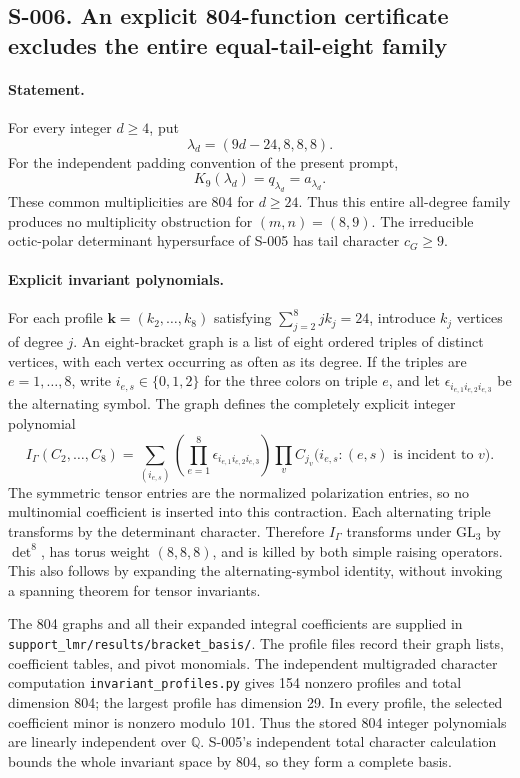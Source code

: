 \subsection*{S-006. An explicit 804-function certificate excludes the entire equal-tail-eight family}

\paragraph{Statement.}
For every integer $d\geq4$, put
\[
                 \lambda_d=(9d-24,8,8,8).
\]
For the independent padding convention of the present prompt,
\[
                 K_9(\lambda_d)=q_{\lambda_d}=a_{\lambda_d}.
\]
These common multiplicities are 804 for $d\geq24$.
Thus this entire all-degree family produces no multiplicity obstruction
for $(m,n)=(8,9)$.  The irreducible octic-polar determinant hypersurface
of S-005 has tail character $c_G\geq9$.

\paragraph{Explicit invariant polynomials.}
For each profile $\boldsymbol{k}=(k_2,\ldots,k_8)$ satisfying
$\sum_{j=2}^8jk_j=24$, introduce $k_j$ vertices of degree $j$.
An eight-bracket graph is a list of eight ordered triples of distinct
vertices, with each vertex occurring as often as its degree.
If the triples are $e=1,\ldots,8$, write $i_{e,s}\in\{0,1,2\}$ for
the three colors on triple $e$, and let $\epsilon_{i_{e,1}i_{e,2}i_{e,3}}$
be the alternating symbol.  The graph defines the completely explicit
integer polynomial
\[
 I_\Gamma(C_2,\ldots,C_8)=
 \sum_{(i_{e,s})}
 \left(\prod_{e=1}^8\epsilon_{i_{e,1}i_{e,2}i_{e,3}}\right)
 \prod_v C_{j_v}\bigl(i_{e,s}:(e,s)\text{ is incident to }v\bigr).
\]
The symmetric tensor entries are the normalized polarization entries,
so no multinomial coefficient is inserted into this contraction.
Each alternating triple transforms by the determinant character.
Therefore $I_\Gamma$ transforms under $\mathrm{GL}_3$ by $\det^8$,
has torus weight $(8,8,8)$, and is killed by both simple raising
operators.  This also follows by expanding the alternating-symbol
identity, without invoking a spanning theorem for tensor invariants.

The 804 graphs and all their expanded integral coefficients are supplied
in \texttt{support\_lmr/results/bracket\_basis/}.  The profile files
record their graph lists, coefficient tables, and pivot monomials.
The independent multigraded character computation
\texttt{invariant\_profiles.py} gives 154 nonzero profiles and total
dimension 804; the largest profile has dimension 29.  In every profile,
the selected coefficient minor is nonzero modulo 101.  Thus the stored
804 integer polynomials are linearly independent over $\mathbb Q$.
S-005's independent total character calculation bounds the whole
invariant space by 804, so they form a complete basis.

